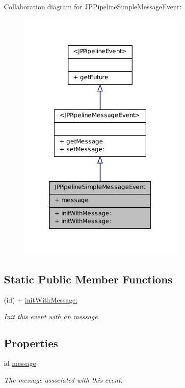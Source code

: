 Collaboration diagram for JPPipelineSimpleMessageEvent:\nopagebreak
\begin{figure}[H]
\begin{center}
\leavevmode
\includegraphics[width=234pt]{a00148}
\end{center}
\end{figure}
\subsection*{Static Public Member Functions}
\begin{DoxyCompactItemize}
\item 
(id) + \hyperlink{a00033_ae47d35264ae6b6465a2ec85bb6ac89f1}{initWithMessage:}
\begin{DoxyCompactList}\small\item\em Init this event with an message. \item\end{DoxyCompactList}\end{DoxyCompactItemize}
\subsection*{Properties}
\begin{DoxyCompactItemize}
\item 
\hypertarget{a00033_a13c199b5198314b666f2eea30d3900dc}{
id \hyperlink{a00033_a13c199b5198314b666f2eea30d3900dc}{message}}
\label{a00033_a13c199b5198314b666f2eea30d3900dc}

\begin{DoxyCompactList}\small\item\em The message associated with this event. \item\end{DoxyCompactList}\end{DoxyCompactItemize}


